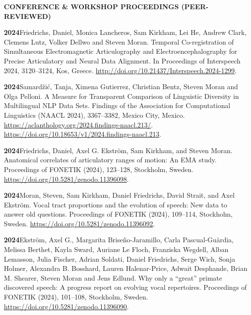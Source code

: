 \documentclass[11pt]{article}
\newcommand{\hangpara}{
 \setlength{\parindent}{0in} %
 \hangindent=0.42in %
}
\begin{document}


\vskip 20pt
\begin{flushleft}
{\bf CONFERENCE \& WORKSHOP PROCEEDINGS (PEER-REVIEWED)}
\end{flushleft}


\hangpara
{\bf 2024}\hspace{1ex}Friedrichs, Daniel, Monica Lancheros, Sam Kirkham, Lei He, Andrew Clark, Clemens Lutz, Volker Dellwo and Steven Moran. Temporal Co-registration of Simultaneous Electromagnetic Articulography and Electroencephalography for Precise Articulatory and Neural Data Alignment. In Proceedings of Interspeech 2024, 3120--3124, Kos, Greece. \url{http://doi.org/10.21437/Interspeech.2024-1299}. %

\vskip 6pt
\hangpara
{\bf 2024}\hspace{1ex}Samardžić, Tanja, Ximena Gutierrez, Christian Bentz, Steven Moran and Olga Pelloni. A Measure for Transparent Comparison of Linguistic Diversity in Multilingual NLP Data Sets. Findings of the Association for Computational Linguistics (NAACL 2024), 3367--3382, Mexico City, Mexico. \url{https://aclanthology.org/2024.findings-naacl.213/}. \url{https://doi.org/10.18653/v1/2024.findings-naacl.213}.%

\vskip 6pt
\hangpara
{\bf 2024}\hspace{1ex}Friedrichs, Daniel, Axel G. Ekström, Sam Kirkham, and Steven Moran. Anatomical correlates of articulatory ranges of motion: An EMA study. Proceedings of FONETIK (2024), 123--128, Stockholm, Sweden. \url{https://doi.org/10.5281/zenodo.11396098}. %

\vskip 6pt
\hangpara
{\bf 2024}\hspace{1ex}Moran, Steven, Sam Kirkham, Daniel Friedrichs, David Strait, and Axel Ekström. Vocal tract proportions and the evolution of speech: New data to answer old questions. Proceedings of FONETIK (2024), 109--114, Stockholm, Sweden. \url{https://doi.org/10.5281/zenodo.11396092}.

\vskip 6pt
\hangpara
{\bf 2024}\hspace{1ex}Ekström, Axel G., Margarita Briseño-Jaramillo, Carla Pascual-Guàrdia, Melissa Berthet, Kayla Sward, Auriane Le Floch, Franziska Wegdell, Alban Lemasson, Julia Fischer, Adrian Soldati, Daniel Friedrichs, Serge Wich, Sonja Holmer, Alexandra B. Bosshard, Lauren Halenar-Price, Adwait Desphande, Brian M. Shearer, Steven Moran and Jens Edlund. Why only a ``great'' primate discovered speech: A progress report on evolving vocal repertoires. Proceedings of FONETIK (2024), 101--108, Stockholm, Sweden. \url{https://doi.org/10.5281/zenodo.11396090}.
\end{document}
